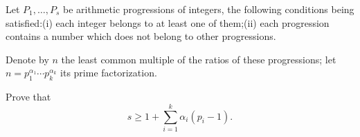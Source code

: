 Let $P_1, \ldots , P_s$ be arithmetic progressions of integers, the following conditions being satisfied:(i) each integer belongs to at least one of them;(ii) each progression contains a number which does not belong to other progressions.

Denote by $n$ the least common multiple of the ratios of these progressions; let $n=p_1^{\alpha_1} \cdots p_k^{\alpha_k}$ its prime factorization.

Prove that \[s \geq 1 + \sum^k_{i=1} \alpha_i (p_i - 1).\]